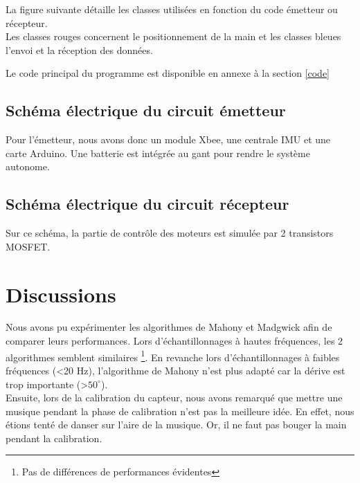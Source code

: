 La figure suivante détaille les classes utilisées en fonction du code émetteur ou récepteur. \\
Les classes rouges concernent le positionnement de la main et les classes bleues l'envoi et la réception des données.\\

 
 Le code principal du programme est disponible en annexe à la section \ref{code}


\section{Schéma électrique du circuit émetteur}

    
    Pour l'émetteur, nous avons donc un module Xbee, une centrale IMU et une carte Arduino. Une batterie est intégrée au gant pour rendre le système autonome.
    
\section{Schéma électrique du circuit récepteur}

    
    Sur ce schéma, la partie de contrôle des moteurs est simulée par 2 transistors MOSFET.



\chapter{Discussions}


Nous avons pu expérimenter les algorithmes de Mahony et Madgwick afin de comparer leurs performances\cite{algo}. Lors d'échantillonnages à hautes fréquences, les 2 algorithmes semblent similaires \footnote{Pas de différences de performances évidentes}. En revanche lors d'échantillonnages à faibles fréquences (<20 Hz), l'algorithme de Mahony n'est plus adapté car la dérive est trop importante (>$50^{\circ}$).\\

Ensuite, lors de la calibration du capteur, nous avons remarqué que mettre une musique pendant la phase de calibration n'est pas la meilleure idée. En effet, nous étions tenté de danser sur l'aire de la musique. Or, il ne faut pas bouger la main pendant la calibration.\\

